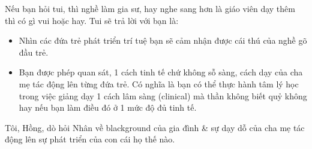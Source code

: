 \documentclass[12pt,twoside]{book}
\begin{document}
Nếu bạn hỏi tui, thì nghề làm gia sư, hay nghe sang hơn là giáo viên dạy thêm thì có gì vui hoặc hay. Tui sẽ trả lời với bạn là:
\begin{itemize}
	\item Nhìn các đứa trẻ phát triển trí tuệ bạn sẽ cảm nhận được cái thú của nghề gõ đầu trẻ.
	
	\item Bạn được phép quan sát, 1 cách tinh tế chứ không sỗ sàng, cách dạy của cha mẹ tác động lên từng đứa trẻ. Có nghĩa là bạn có thể thực hành tâm lý học trong việc giảng dạy 1 cách lâm sàng (clinical) mà thần không biết quỷ không hay nếu bạn làm điều đó ở 1 mức độ đủ tinh tế.
\end{itemize}
Tôi, {\sf Hồng}, dò hỏi {\sf Nhân} về blackground của gia đình \& sự dạy dỗ của cha mẹ tác động lên sự phát triển của con cái họ thế nào.
\end{document}
